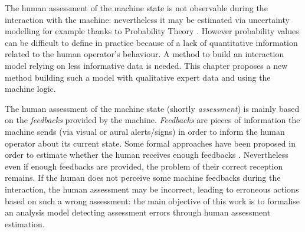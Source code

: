 The human assessment of the machine state is not observable 
during the interaction with the machine: nevertheless it
may be estimated via uncertainty modelling for example thanks to
Probability Theory \cite{Oaksford07}. However probability values 
can be difficult to define in practice 
because of a lack of quantitative information related to the human operator's 
behaviour. A method to build an interaction model 
relying on less informative data is needed. 
This chapter proposes a new method building such a model 
with qualitative expert data and using the machine logic.

The human assessment of the machine state (shortly {\em assessment}) is mainly 
based on the {\em feedbacks} provided by the machine. {\em Feedbacks} are pieces 
of information the machine sends (via visual or aural alerts/signs) in order 
to inform the human operator about its current state. Some formal approaches 
have been proposed in order to estimate whether the human receives enough 
feedbacks \cite{Ozveren90,combefis11}. Nevertheless even if enough feedbacks 
are provided, the problem of their correct reception remains. If the human does 
not perceive some machine feedbacks during the interaction, the human assessment may 
be incorrect, leading to erroneous actions based on such a wrong assessment: 
the main objective of this work is to formalise an analysis model detecting 
assessment errors through human assessment estimation.\\

